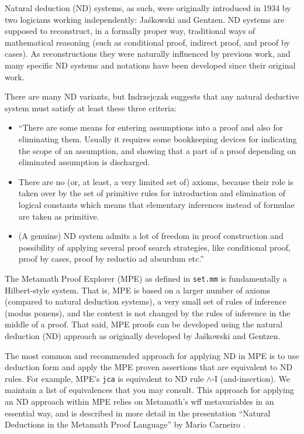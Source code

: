 Natural deduction
(ND) systems, as such, were originally introduced in
1934 by two logicians working independently: Ja\'skowski and Gentzen. ND
systems are supposed to reconstruct, in a formally proper way, traditional
ways of mathematical reasoning (such as conditional proof, indirect proof,
and proof by cases). As reconstructions they were naturally influenced
by previous work, and many specific ND systems and notations have been
developed since their original work.

There are many ND variants, but
Indrzejczak \cite[p.~31-32]{Indrzejczak}
suggests that any natural deductive system must satisfy at
least these three criteria:

\begin{itemize}
\item ``There are some means for entering assumptions into a proof and
also for eliminating them. Usually it requires some bookkeeping devices
for indicating the scope of an assumption, and showing that a part of
a proof depending on eliminated assumption is discharged.
\item There are no (or, at least, a very limited set of) axioms, because
their role is taken over by the set of primitive rules for introduction
and elimination of logical constants which means that elementary
inferences instead of formulae are taken as primitive.
\item (A genuine) ND system admits a lot of freedom in proof construction
and possibility of applying several proof search strategies, like
conditional proof, proof by cases, proof by reductio ad absurdum etc.''
\end{itemize}

The Metamath Proof Explorer (MPE) as defined in \texttt{set.mm}
is fundamentally a Hilbert-style system.
That is, MPE is based on a larger number of axioms (compared
to natural deduction systems), a very small set of rules of inference
(modus ponens), and the context is not changed by the rules of inference
in the middle of a proof. That said, MPE proofs can be developed using
the natural deduction (ND) approach as originally developed by Ja\'skowski
and Gentzen.

The most common and recommended approach for applying ND in MPE is to use
deduction form%
and apply the MPE proven assertions that are equivalent to ND rules.
For example, MPE's \texttt{jca} is equivalent to ND rule $\land$-I
(and-insertion).
We maintain a list of equivalences that you may consult.
This approach for applying an ND approach within MPE relies on Metamath's
wff metavariables in an essential way, and is described in more detail
in the presentation ``Natural Deductions in the Metamath Proof Language''
by Mario Carneiro \cite{CarneiroND}.

